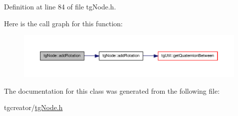Definition at line 84 of file tg\-Node.\-h.



Here is the call graph for this function\-:\nopagebreak
\begin{figure}[H]
\begin{center}
\leavevmode
\includegraphics[width=350pt]{classtg_node_a81ecb640ebfbd43461cc434696d6cdbb_cgraph}
\end{center}
\end{figure}




The documentation for this class was generated from the following file\-:\begin{DoxyCompactItemize}
\item 
tgcreator/\hyperlink{tg_node_8h}{tg\-Node.\-h}\end{DoxyCompactItemize}
